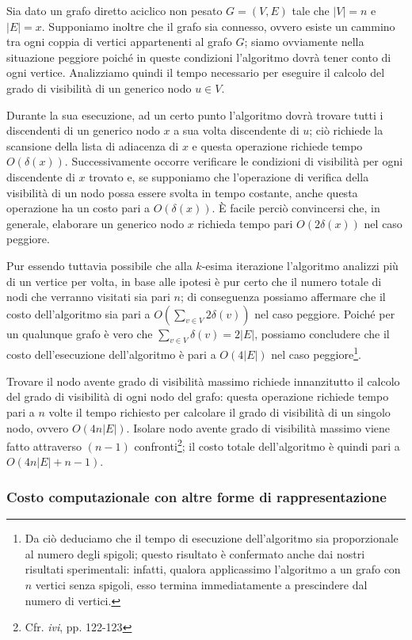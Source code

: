 \documentclass[10pt,a4paper,titlepage]{article}
\begin{document}
Sia dato un grafo diretto aciclico non pesato $G = (V, E)$ tale che $|V| = n$ e $|E| = x$. Supponiamo inoltre che il grafo sia connesso, ovvero esiste un cammino tra ogni coppia di vertici appartenenti al grafo $G$; siamo ovviamente nella situazione peggiore poiché in queste condizioni l'algoritmo dovrà tener conto di ogni vertice. Analizziamo quindi il tempo necessario per eseguire il calcolo del grado di visibilità di un generico nodo $u \in V$. 

Durante la sua esecuzione, ad un certo punto l'algoritmo dovrà trovare tutti i discendenti di un generico nodo $x$ a sua volta discendente di $u$; ciò richiede la scansione della lista di adiacenza di $x$ e questa operazione richiede tempo $O(\delta(x))$. Successivamente occorre verificare le condizioni di visibilità per ogni discendente di $x$ trovato e, se supponiamo che l'operazione di verifica della visibilità di un nodo possa essere svolta in tempo costante, anche questa operazione ha un costo pari a $O(\delta(x))$. È facile perciò convincersi che, in generale, elaborare un generico nodo $x$ richieda tempo pari $O(2\delta(x))$ nel caso peggiore. 

Pur essendo tuttavia possibile che alla $k$-esima iterazione l'algoritmo analizzi più di un vertice per volta, in base alle ipotesi è pur certo che il numero totale di nodi che verranno visitati sia pari $n$; di conseguenza possiamo affermare che il costo dell'algoritmo sia pari a $O(\sum_{v \in V} 2\delta(v))$ nel caso peggiore. Poiché per un qualunque grafo è vero che $\sum_{v \in V} \delta(v) = 2|E|$, possiamo concludere che il costo dell'esecuzione dell'algoritmo è pari a $O(4|E|)$ nel caso peggiore\footnote{Da ciò deduciamo che il tempo di esecuzione dell'algoritmo sia proporzionale al numero degli spigoli; questo risultato è confermato anche dai nostri risultati sperimentali: infatti, qualora applicassimo l'algoritmo a un grafo con $n$ vertici senza spigoli, esso termina immediatamente a prescindere dal numero di vertici.}. 

Trovare il nodo avente grado di visibilità massimo richiede innanzitutto il calcolo del grado di visibilità di ogni nodo del grafo: questa operazione richiede tempo pari a $n$ volte il tempo richiesto per calcolare il grado di visibilità di un singolo nodo, ovvero $O(4n|E|)$. Isolare nodo avente grado di visibilità massimo viene fatto attraverso $(n -1)$ confronti\footnote{Cfr. \textit{ivi}, pp. 122-123}; il costo totale dell'algoritmo è quindi pari a $O(4n|E| +n -1)$.

\subsubsection{Costo computazionale con altre forme di rappresentazione}
\end{document}
